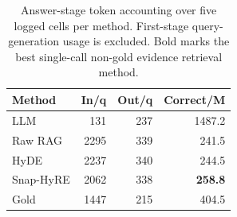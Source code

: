 \begin{table}[t]
\centering
\caption{Answer-stage token accounting over five logged cells per method. First-stage query-generation usage is excluded. Bold marks the best single-call non-gold evidence retrieval method.}
\label{tab:usage_metrics}
\scriptsize
\setlength{\tabcolsep}{1pt}
\begin{tabular}{lrrr}
\toprule
Method & In/q & Out/q & Correct/M \\
\midrule
LLM & 131 & 237 & 1487.2 \\
Raw RAG & 2295 & 339 & 241.5 \\
HyDE & 2237 & 340 & 244.5 \\
Snap-HyRE & 2062 & 338 & \textbf{258.8} \\
Gold & 1447 & 215 & 404.5 \\
\bottomrule
\end{tabular}
\end{table}
